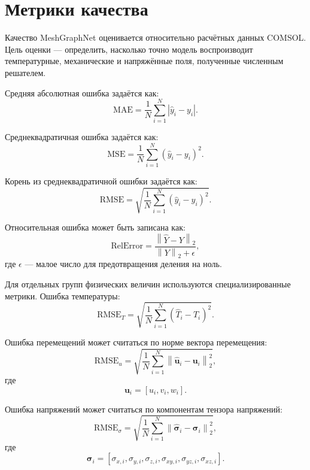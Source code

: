 \section{Метрики качества}

Качество MeshGraphNet оценивается относительно расчётных данных COMSOL. Цель оценки --- определить, насколько точно модель воспроизводит температурные, механические и напряжённые поля, полученные численным решателем.

Средняя абсолютная ошибка задаётся как:
\begin{equation}
    \mathrm{MAE}=\frac{1}{N}\sum_{i=1}^{N}|\hat{y}_i-y_i|.
\end{equation}

Среднеквадратичная ошибка задаётся как:
\begin{equation}
    \mathrm{MSE}=\frac{1}{N}\sum_{i=1}^{N}(\hat{y}_i-y_i)^2.
\end{equation}

Корень из среднеквадратичной ошибки задаётся как:
\begin{equation}
    \mathrm{RMSE}=\sqrt{\frac{1}{N}\sum_{i=1}^{N}(\hat{y}_i-y_i)^2}.
\end{equation}

Относительная ошибка может быть записана как:
\begin{equation}
    \mathrm{RelError}=\frac{\left\|\hat{Y}-Y\right\|_2}{\left\|Y\right\|_2+\epsilon},
\end{equation}
где $\epsilon$ --- малое число для предотвращения деления на ноль.

Для отдельных групп физических величин используются специализированные метрики. Ошибка температуры:
\begin{equation}
    \mathrm{RMSE}_T=\sqrt{\frac{1}{N}\sum_{i=1}^{N}(\hat{T}_i-T_i)^2}.
\end{equation}

Ошибка перемещений может считаться по норме вектора перемещения:
\begin{equation}
    \mathrm{RMSE}_u=\sqrt{\frac{1}{N}\sum_{i=1}^{N}\left\|\hat{\mathbf{u}}_i-\mathbf{u}_i\right\|_2^2},
\end{equation}
где
\begin{equation}
    \mathbf{u}_i=[u_i,v_i,w_i].
\end{equation}

Ошибка напряжений может считаться по компонентам тензора напряжений:
\begin{equation}
    \mathrm{RMSE}_{\sigma}=\sqrt{\frac{1}{N}\sum_{i=1}^{N}\left\|\hat{\boldsymbol{\sigma}}_i-\boldsymbol{\sigma}_i\right\|_2^2},
\end{equation}
где
\begin{equation}
    \boldsymbol{\sigma}_i=[\sigma_{x,i},\sigma_{y,i},\sigma_{z,i},\sigma_{xy,i},\sigma_{yz,i},\sigma_{xz,i}].
\end{equation}

